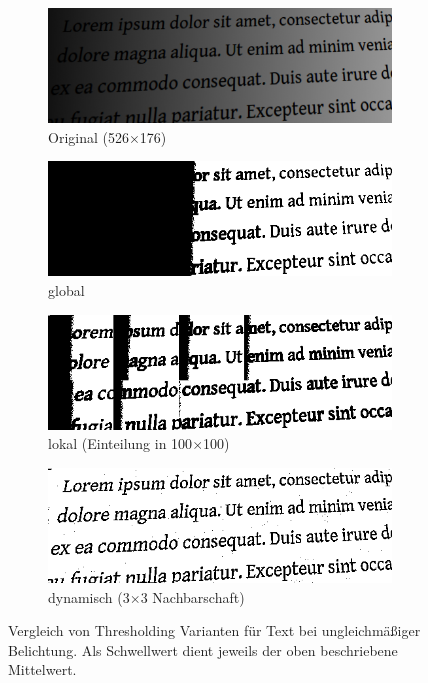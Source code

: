 \begin{figure}[H]
  \label{fig:segmentation}
  \centering
  \begin{subfigure}{0.49\linewidth}
    \centering
    \includegraphics[width=\linewidth]{img/basics/segmentation/original}
    \caption{Original (526$\times$176)}
  \end{subfigure}
  \begin{subfigure}{0.49\linewidth}
    \centering
    \includegraphics[width=\linewidth]{img/basics/segmentation/global}
    \caption{global}
  \end{subfigure}
  \begin{subfigure}{0.49\linewidth}
    \centering
    \includegraphics[width=\linewidth]{img/basics/segmentation/local}
    \caption{lokal (Einteilung in 100$\times$100)}
  \end{subfigure}
  \begin{subfigure}{0.49\linewidth}
    \centering
    \includegraphics[width=\linewidth]{img/basics/segmentation/dynamic}
    \caption{dynamisch (3$\times$3 Nachbarschaft)}
  \end{subfigure}
  \caption[Vergleich von Thresholding Varianten]{Vergleich von Thresholding Varianten für Text bei ungleichmäßiger Belichtung. Als Schwellwert dient jeweils der oben beschriebene Mittelwert.}
\end{figure}

